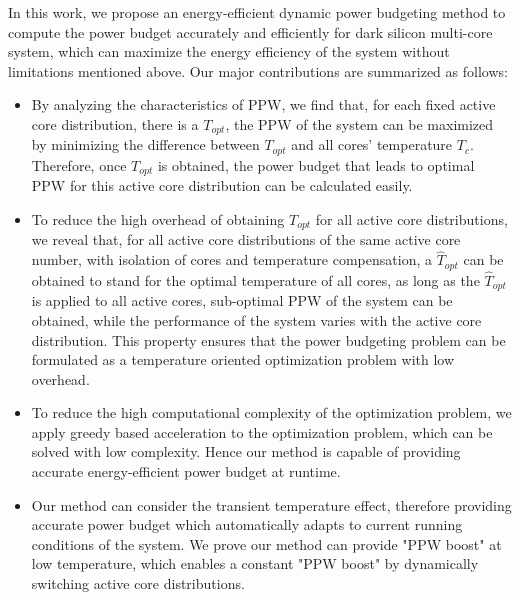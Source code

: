 In this work, we propose an energy-efficient dynamic power budgeting method to compute the power budget accurately and efficiently for dark silicon multi-core system, which can maximize the energy efficiency of the system without limitations mentioned above. Our major contributions are summarized as follows:
\begin{itemize}

\item By analyzing the characteristics of PPW, we find that, for each fixed active core distribution, there is a $T_{opt}$, the PPW of the system can be maximized by minimizing the difference between $T_{opt}$ and all cores' temperature $T_{c}$. Therefore, once $T_{opt}$ is obtained, the power budget that leads to optimal PPW for this active core distribution can be calculated easily.
\item To reduce the high overhead of obtaining $T_{opt}$ for all active core distributions, we reveal that, for all active core distributions of the same active core number, with isolation of cores and temperature compensation, a $\hat{T}_{opt}$ can be obtained to stand for the optimal temperature of all cores, as long as the $\hat{T}_{opt}$ is applied to all active cores, sub-optimal PPW of the system can be obtained, while the performance of the system varies with the active core distribution. This property ensures that the power budgeting problem can be formulated as a temperature oriented optimization problem with low overhead.
\item To reduce the high computational complexity of the optimization problem, we apply greedy based acceleration to the optimization problem, which can be solved with low complexity. Hence our method is capable of providing accurate energy-efficient power budget at runtime.
\item Our method can consider the transient temperature effect, therefore providing accurate power budget which automatically adapts to current running conditions of the system. We prove our method can provide "PPW boost" at low temperature, which enables a constant "PPW boost" by dynamically switching active core distributions.
\end{itemize} 